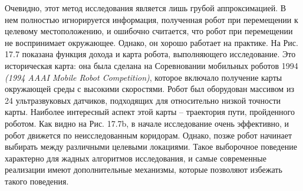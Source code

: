 \documentclass[10pt,a4paper]{article}
\begin{document}
Очевидно, этот метод исследования является лишь грубой аппроксимацией. В нем полностью игнорируется информация, полученная робот при перемещении к целевому местоположению, и ошибочно считается, что робот при перемещении не воспринимает окружающее. Однако, он хорошо работает на практике. На Рис. 17.7 показана функция дохода и карта робота, выполняющего исследование. Это историческая карта: она была сделана на Соревновании мобильных роботов 1994 \textit{(1994 AAAI Mobile Robot Competition)}, которое включало получение карты окружающей среды с высокими скоростями. Робот был оборудован массивом из 24 ультразвуковых датчиков, подходящих для относительно низкой точности карты. Наиболее интересный аспект этой карты – траектория пути, пройденного роботом. Как видно на Рис. 17.7b, в начале исследование очень эффективно, и робот движется по неисследованным коридорам. Однако, позже робот начинает выбирать между различными целевыми локациями. Такое выборочное поведение характерно для жадных алгоритмов исследования, и самые современные реализации имеют дополнительные механизмы, которые позволяют избежать такого поведения.
\end{document}
